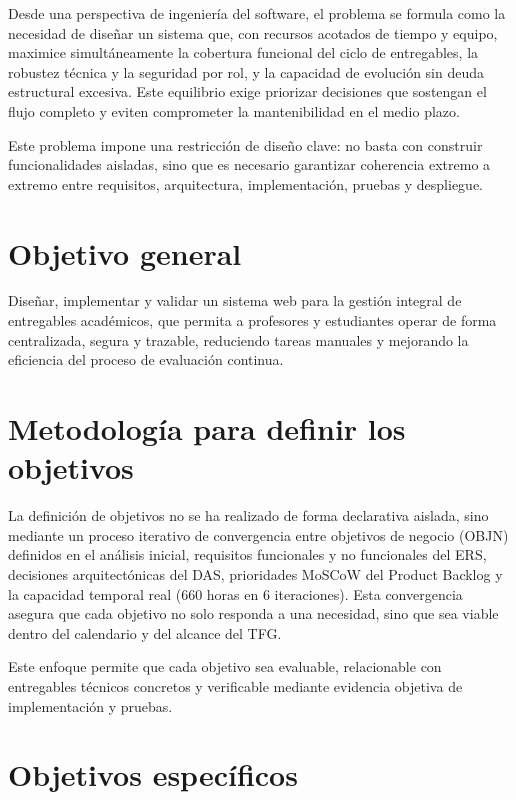 Desde una perspectiva de ingenier\'ia del software,
el problema se formula como la necesidad de dise\~nar un sistema que,
con recursos acotados de tiempo y equipo,
maximice simult\'aneamente la cobertura funcional del ciclo de entregables, la robustez t\'ecnica y la seguridad por rol, y la capacidad de evoluci\'on sin deuda estructural excesiva. Este equilibrio exige priorizar decisiones que sostengan el flujo completo y eviten comprometer la mantenibilidad en el medio plazo.

Este problema impone una restricci\'on de dise\~no clave:
no basta con construir funcionalidades aisladas,
sino que es necesario garantizar coherencia extremo a extremo
entre requisitos, arquitectura, implementaci\'on, pruebas y despliegue.

\FloatBarrier
\section{Objetivo general}

Dise\~nar, implementar y validar un sistema web para la gesti\'on integral de entregables acad\'emicos,
que permita a profesores y estudiantes operar de forma centralizada, segura y trazable,
reduciendo tareas manuales y mejorando la eficiencia del proceso de evaluaci\'on continua.

\FloatBarrier
\section{Metodolog\'ia para definir los objetivos}

La definici\'on de objetivos no se ha realizado de forma declarativa aislada,
sino mediante un proceso iterativo de convergencia entre objetivos de negocio (OBJN) definidos en el an\'alisis inicial, requisitos funcionales y no funcionales del ERS, decisiones arquitect\'onicas del DAS, prioridades MoSCoW del Product Backlog y la capacidad temporal real (660 horas en 6 iteraciones). Esta convergencia asegura que cada objetivo no solo responda a una necesidad, sino que sea viable dentro del calendario y del alcance del TFG.

Este enfoque permite que cada objetivo sea evaluable,
relacionable con entregables t\'ecnicos concretos
y verificable mediante evidencia objetiva de implementaci\'on y pruebas.

\FloatBarrier
\section{Objetivos espec\'ificos}

